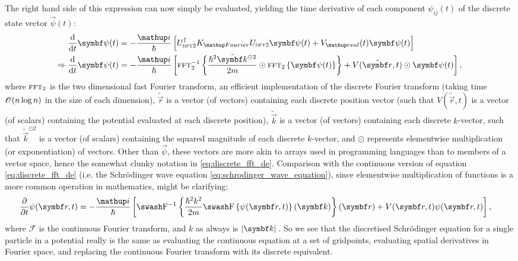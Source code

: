 The right hand side of this expression can now simply be evaluated, yielding the time derivative of each component $\psi_{ij}(t)$ of the discrete state vector $\vec\psi(t)$:
\begin{align}\label{eq:discrete_de_matrices}
\dv{t}\vec\psi(t) &= -\frac{\ii}{\hbar} \left[U^\dagger_{\textsc{dft2}}K_\up{Fourier}U_{\textsc{dft2}}\vec\psi(t) + V_\up{real}(t)\vec\psi(t)\right]\\
\Rightarrow \dv{t}\vec\psi(t) &= -\frac{\ii}{\hbar} \left[
\fft_2^{-1}\left\{\frac{\hbar^2 \tilde{\vec k}^{\odot2}}{2m}\odot\fft_2\left\{\vec\psi(t)\right\}\right\}
+ V(\tilde{\vec r}, t)\odot\vec\psi(t)\right],\label{eq:discrete_fft_de}
\end{align}
where $\operatorname{\textsc{fft}}_2$ is the two dimensional fast Fourier transform, an efficient implementation of the discrete Fourier transform (taking time $\mathscr{O}(n \log n)$ in the size of each dimension), $\tilde{\vec r}$ is a vector (of vectors) containing each discrete position vector (such that $V(\tilde{\vec r}, t)$ is a vector (of scalars) containing the potential evaluated at each discrete position), $\tilde{\vec k}$ is a vector (of vectors) containing each discrete $k$-vector, such that $\tilde{\vec k}^{\odot2}$ is a vector (of scalars) containing the squared magnitude of each discrete $k$-vector, and 
$\odot$ represents elementwise multiplication (or exponentiation) of vectors. Other than $\vec \psi$, these vectors are more akin to arrays used in programming languages than to members of a vector space, hence the somewhat clunky notation in \eqref{eq:discrete_fft_de}. Comparison with the continuous version of equation \eqref{eq:discrete_fft_de} (i.e. the Schr\"odinger wave equation \eqref{eq:schrodinger_wave_equation}), since elementwise multiplication of functions is a more common operation in mathematics, might be clarifying:
\begin{align}
\pdv{t}\psi(\vec r, t) &= -\frac{\ii}{\hbar} \left[
\mathcal{F}^{-1}\left\{
\frac{\hbar^2 k^2}{2m}\mathcal{F}\left\{\psi(\vec r, t)\right\}(\vec k)
\right\}(\vec r)
+ V(\vec r, t)\psi(\vec r, t)
\right],
\end{align}
where $\mathcal{F}$ is the continuous Fourier transform, and $k$ as always is $\abs{\vec k}$. So we see that the discretised Schr\"odinger equation for a single particle in a potential really is the same as evaluating the continuous equation at a set of gridpoints, evaluating spatial derivatives in Fourier space, and replacing the continuous Fourier transform with its discrete equivalent.

